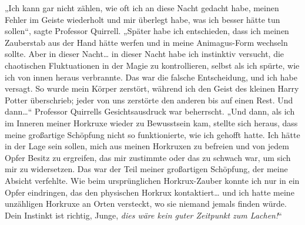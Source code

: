 „Ich kann gar nicht zählen, wie oft ich an diese Nacht gedacht habe, meinen Fehler im Geiste wiederholt und mir überlegt habe, was ich besser hätte tun sollen“, sagte Professor Quirrell. „Später habe ich entschieden, dass ich meinen Zauberstab aus der Hand hätte werfen und in meine Animagus-Form wechseln sollte. Aber in dieser Nacht… in dieser Nacht habe ich instinktiv versucht, die chaotischen Fluktuationen in der Magie zu kontrollieren, selbst als ich spürte, wie ich von innen heraus verbrannte. Das war die falsche Entscheidung, und ich habe versagt. So wurde mein Körper zerstört, während ich den Geist des kleinen Harry Potter überschrieb; jeder von uns zerstörte den anderen bis auf einen Rest. Und dann…“
Professor Quirrells Gesichtsausdruck war beherrscht.
„Und dann, als ich im Inneren meiner Horkruxe wieder zu Bewusstsein kam, stellte sich heraus, dass meine großartige Schöpfung nicht so funktionierte, wie ich gehofft hatte. Ich hätte in der Lage sein sollen, mich aus meinen Horkruxen zu befreien und von jedem Opfer Besitz zu ergreifen, das mir zustimmte oder das zu schwach war, um sich mir zu widersetzen. Das war der Teil meiner großartigen Schöpfung, der meine Absicht verfehlte. Wie beim ursprünglichen Horkrux-Zauber konnte ich nur in ein Opfer eindringen, das den physischen Horkrux kontaktiert… und ich hatte meine unzähligen Horkruxe an Orten versteckt, wo sie niemand jemals finden würde. Dein Instinkt ist richtig, Junge, \emph{dies wäre kein guter Zeitpunkt zum Lachen!}“


